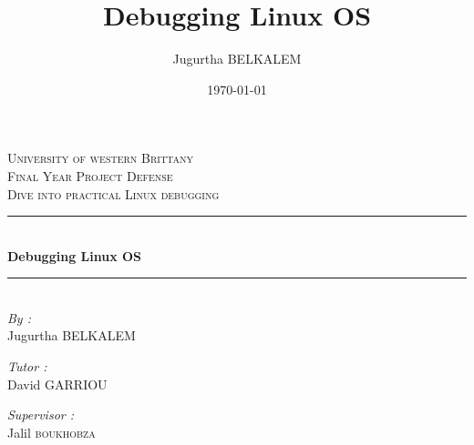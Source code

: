 \documentclass[12pt,oneside]{article}
\author{Jugurtha BELKALEM}
\title{Debugging Linux OS \\ \vspace{20px} }
\date{\today}
\begin{document}
\begin{titlepage}

\newcommand{\HRule}{\rule{\linewidth}{0.5mm}} %

\center %
 

\textsc{\LARGE University of western Brittany}\\[1.5cm] %
\textsc{\Large Final Year Project Defense}\\[0.5cm] %
\textsc{\large Dive into practical Linux debugging}\\[0.5cm] %


\HRule \\[0.4cm]
{ \huge \bfseries Debugging Linux OS}\\[0.4cm] %
\HRule \\[1.5cm]
 
\Large \emph{By :}\\
Jugurtha \textsc{BELKALEM}\\[3cm] %

\begin{minipage}{0.4\textwidth}
\begin{flushleft} \large
\emph{Tutor :}\\
David \textsc{GARRIOU} %
\end{flushleft}
\end{minipage}
\begin{minipage}{0.4\textwidth}
\begin{flushright} \large
\emph{Supervisor :} \\
Jalil \textsc{boukhobza} %
\end{flushright}
\end{minipage}\\[2cm]


\end{titlepage}
\end{document}
